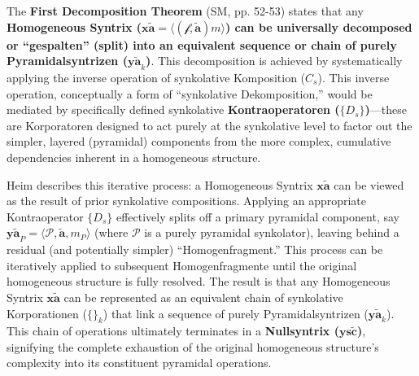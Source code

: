 \documentclass[
    12pt,              %
    a4paper,           %
    headings=normal,   %
    twoside=true,      %
    BCOR=8mm,          %
]{scrbook}
\newcommand{\q}[1]{\enquote{#1}}
\newcommand{\syntrix}{\bm{y\widetilde{a}}}
\newcommand{\homogeneoussyntrix}{\bm{x\widetilde{a}}}
\newcommand{\metrophor}{\bm{\widetilde{a}}}
\newcommand{\synkolator}{\mathcal{f}}
\newcommand{\synkolationsstufe}{m}
\newcommand{\nullsyntrix}{\bm{ys\widetilde{c}}}
\begin{document}
The \textbf{First Decomposition Theorem} (SM, pp. 52-53) states that any \textbf{Homogeneous Syntrix (\(\homogeneoussyntrix = \langle (\synkolator, \metrophor) \synkolationsstufe \rangle\)) can be universally decomposed or \q{gespalten} (split) into an equivalent sequence or chain of purely Pyramidalsyntrizen (\(\syntrix_k\))}. This decomposition is achieved by systematically applying the inverse operation of synkolative Komposition (\(C_s\)). This inverse operation, conceptually a form of \q{synkolative Dekomposition,} would be mediated by specifically defined synkolative \textbf{Kontraoperatoren (\(\{D_s\}\))}—these are Korporatoren designed to act purely at the synkolative level to factor out the simpler, layered (pyramidal) components from the more complex, cumulative dependencies inherent in a homogeneous structure.

Heim describes this iterative process: a Homogeneous Syntrix \(\homogeneoussyntrix\) can be viewed as the result of prior synkolative compositions. Applying an appropriate Kontraoperator \(\{D_s\}\) effectively splits off a primary pyramidal component, say \(\syntrix_P = \langle \mathcal{P}, \metrophor, \synkolationsstufe_P \rangle\) (where \(\mathcal{P}\) is a purely pyramidal synkolator), leaving behind a residual (and potentially simpler) \q{Homogenfragment.} This process can be iteratively applied to subsequent Homogenfragmente until the original homogeneous structure is fully resolved. The result is that any Homogeneous Syntrix \(\homogeneoussyntrix\) can be represented as an equivalent chain of synkolative Korporationen (\(\{ \}_k\)) that link a sequence of purely Pyramidalsyntrizen (\(\syntrix_k\)). This chain of operations ultimately terminates in a \textbf{Nullsyntrix (\(\nullsyntrix\))}, signifying the complete exhaustion of the original homogeneous structure's complexity into its constituent pyramidal operations.
\end{document}
